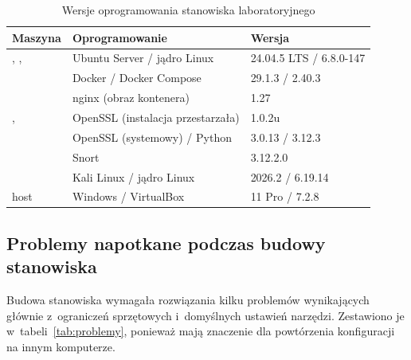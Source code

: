 \begin{table}[htbp]
\centering\small
\begin{tabularx}{\textwidth}{@{}l L l@{}}
\toprule
\textbf{Maszyna} & \textbf{Oprogramowanie} & \textbf{Wersja} \\
\midrule
{}, ,  & Ubuntu Server / jądro Linux & 24.04.5 LTS / 6.8.0-147 \\
 & Docker / Docker Compose & 29.1.3 / 2.40.3 \\
 & nginx (obraz kontenera) & 1.27 \\
,  & OpenSSL (instalacja przestarzała) & 1.0.2u \\
 & OpenSSL (systemowy) / Python & 3.0.13 / 3.12.3 \\
 & Snort & 3.12.2.0 \\
 & Kali Linux / jądro Linux & 2026.2 / 6.19.14 \\
host & Windows / VirtualBox & 11 Pro / 7.2.8 \\
\bottomrule
\end{tabularx}
\caption{Wersje oprogramowania stanowiska laboratoryjnego}
\label{tab:wersje}
\end{table}

\subsection{Problemy napotkane podczas budowy stanowiska}

Budowa stanowiska wymagała rozwiązania kilku problemów wynikających głównie z~ograniczeń sprzętowych i~domyślnych ustawień narzędzi. Zestawiono je w~tabeli~\ref{tab:problemy}, ponieważ mają znaczenie dla powtórzenia konfiguracji na innym komputerze.

